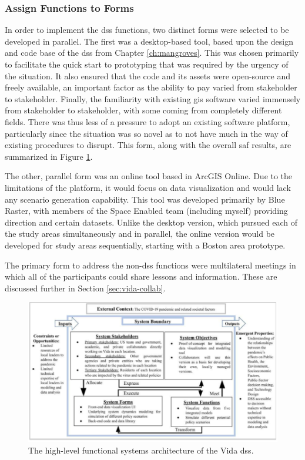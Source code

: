 \subsubsection{Assign Functions to Forms}

In order to implement the \ac{dss} functions, two distinct forms were selected to be developed in parallel. The first was a desktop-based tool, based upon the design and code base of the \ac{dss} from Chapter \ref{ch:mangroves}. This was chosen primarily to facilitate the quick start to prototyping that was required by the urgency of the situation. It also ensured that the code and its assets were open-source and freely available, an important factor as the ability to pay varied from stakeholder to stakeholder. Finally, the familiarity with existing \ac{gis} software varied immensely from stakeholder to stakeholder, with some coming from completely different fields. There was thus less of a pressure to adopt an existing software platform, particularly since the situation was so novel as to not have much in the way of existing procedures to disrupt. This form, along with the overall \ac{saf} results, are summarized in Figure \ref{fig:vida-architecture}.

The other, parallel form was an online tool based in ArcGIS Online. Due to the limitations of the platform, it would focus on data visualization and would lack any scenario generation capability. This tool was developed primarily by Blue Raster, with members of the Space Enabled team (including myself) providing direction and certain datasets. Unlike the desktop version, which pursued each of the study areas simultaneously and in parallel, the online version would be developed for study areas sequentially, starting with a Boston area prototype.

The primary form to address the non-\ac{dss} functions were multilateral meetings in which all of the participants could share lessons and information. These are discussed further in Section \ref{sec:vida-collab}.


\begin{figure}[!htb]
	\centering
	\includegraphics[width=1\textwidth]{Figures/chap5/architecture.png}
	\caption{The high-level functional systems architecture of the Vida \ac{dss}.}
	\label{fig:vida-architecture}
\end{figure}

